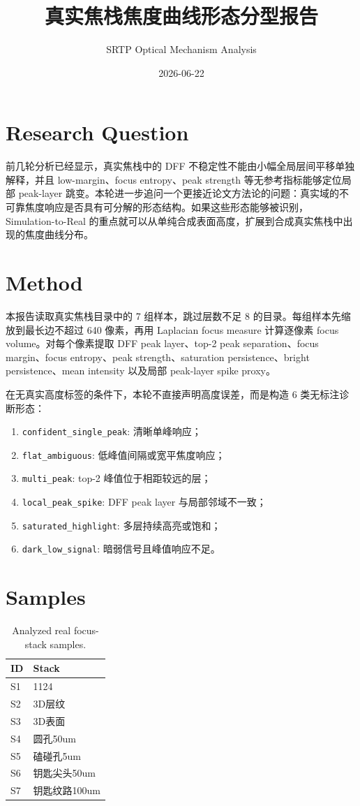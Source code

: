 \documentclass[11pt]{article}
\title{真实焦栈焦度曲线形态分型报告}
\author{SRTP Optical Mechanism Analysis}
\date{2026-06-22}
\begin{document}
\maketitle

\section{Research Question}

前几轮分析已经显示，真实焦栈中的 DFF 不稳定性不能由小幅全局层间平移单独解释，并且 low-margin、focus entropy、peak strength 等无参考指标能够定位局部 peak-layer 跳变。本轮进一步追问一个更接近论文方法论的问题：真实域的不可靠焦度响应是否具有可分解的形态结构。如果这些形态能够被识别，Simulation-to-Real 的重点就可以从单纯合成表面高度，扩展到合成真实焦栈中出现的焦度曲线分布。

\section{Method}

本报告读取真实焦栈目录中的 7 组样本，跳过层数不足 8 的目录。每组样本先缩放到最长边不超过 640 像素，再用 Laplacian focus measure 计算逐像素 focus volume。对每个像素提取 DFF peak layer、top-2 peak separation、focus margin、focus entropy、peak strength、saturation persistence、bright persistence、mean intensity 以及局部 peak-layer spike proxy。

在无真实高度标签的条件下，本轮不直接声明高度误差，而是构造 6 类无标注诊断形态：
\begin{enumerate}
  \item \texttt{confident\_single\_peak}: 清晰单峰响应；
  \item \texttt{flat\_ambiguous}: 低峰值间隔或宽平焦度响应；
  \item \texttt{multi\_peak}: top-2 峰值位于相距较远的层；
  \item \texttt{local\_peak\_spike}: DFF peak layer 与局部邻域不一致；
  \item \texttt{saturated\_highlight}: 多层持续高亮或饱和；
  \item \texttt{dark\_low\_signal}: 暗弱信号且峰值响应不足。
\end{enumerate}

\section{Samples}

\begin{table}[H]
\centering
\small
\begin{tabular}{ll}
\toprule
ID & Stack \\
\midrule
S1 & 1124 \\
S2 & 3D层纹 \\
S3 & 3D表面 \\
S4 & 圆孔50um \\
S5 & 磕碰孔5um \\
S6 & 钥匙尖头50um \\
S7 & 钥匙纹路100um \\
\bottomrule
\end{tabular}
\caption{Analyzed real focus-stack samples.}
\end{table}
\end{document}
